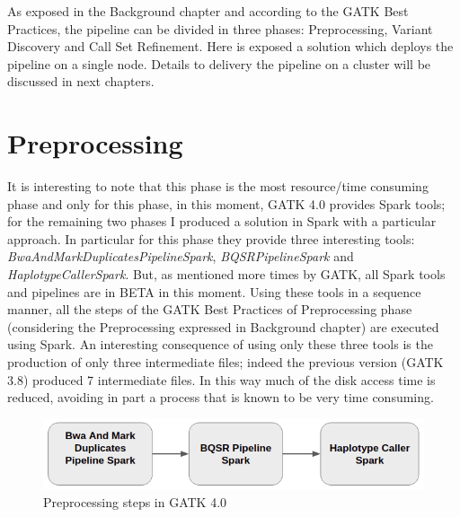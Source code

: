 As exposed in the Background chapter and according to the GATK Best Practices, the pipeline can be divided in three phases: Preprocessing, Variant Discovery and Call Set Refinement. Here is exposed a solution which deploys the pipeline on a single node. Details to delivery the pipeline on a cluster will be discussed in next chapters.


\section{Preprocessing}
It is interesting to note that this phase is the most resource/time consuming phase and only for this phase, in this moment, GATK 4.0 provides Spark tools; for the remaining two phases I produced a solution in Spark with a particular approach.\newline
In particular for this phase they provide three interesting tools: \textit{BwaAndMarkDuplicatesPipelineSpark}, \textit{BQSRPipelineSpark} and \textit{HaplotypeCallerSpark}. But, as mentioned more times by GATK, all Spark tools and pipelines are in BETA in this moment. Using these tools in a sequence manner, all the steps of the GATK Best Practices of Preprocessing phase (considering the Preprocessing expressed in Background chapter) are executed using Spark. An interesting consequence of using only these three tools is the production of only three intermediate files; indeed the previous version (GATK 3.8) produced 7 intermediate files. In this way much of the disk access time is reduced, avoiding in part a process that is known to be very time consuming.
\begin{figure}[h] 
\begin{center}
\includegraphics[scale=0.6]{figure/preprocessing.png}
\end{center}
\caption{Preprocessing steps in GATK 4.0~\label{preprocessing}}
\end{figure}

